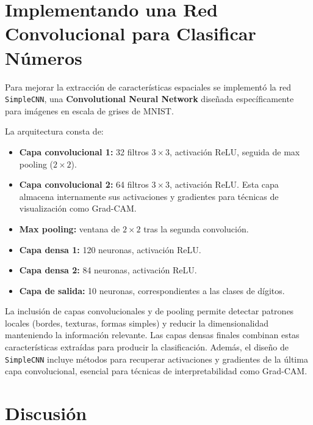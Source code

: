 \section{Implementando una Red Convolucional para Clasificar Números}

Para mejorar la extracción de características espaciales se implementó la red \texttt{SimpleCNN}, una \textbf{Convolutional Neural Network} diseñada específicamente para imágenes en escala de grises de MNIST.

La arquitectura consta de:

\begin{itemize}
	\item \textbf{Capa convolucional 1:} 32 filtros $3 \times 3$, activación ReLU, seguida de max pooling ($2 \times 2$).
	\item \textbf{Capa convolucional 2:} 64 filtros $3 \times 3$, activación ReLU.
	Esta capa almacena internamente sus activaciones y gradientes para técnicas de visualización como Grad-CAM.
	\item \textbf{Max pooling:} ventana de $2 \times 2$ tras la segunda convolución.
	\item \textbf{Capa densa 1:} 120 neuronas, activación ReLU.
	\item \textbf{Capa densa 2:} 84 neuronas, activación ReLU.
	\item \textbf{Capa de salida:} 10 neuronas, correspondientes a las clases de dígitos.
\end{itemize}

La inclusión de capas convolucionales y de pooling permite detectar patrones locales (bordes, texturas, formas simples) y reducir la dimensionalidad manteniendo la información relevante.
Las capas densas finales combinan estas características extraídas para producir la clasificación.
Además, el diseño de \texttt{SimpleCNN} incluye métodos para recuperar activaciones y gradientes de la última capa convolucional, esencial para técnicas de interpretabilidad como Grad-CAM.


\section{Discusión}
